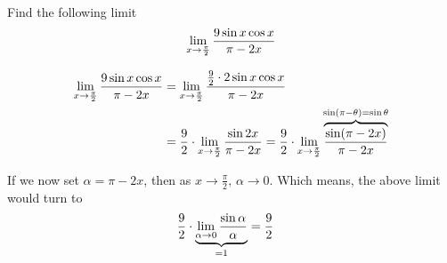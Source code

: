 


\question[3] Find the following limit \[\lim_{x\to\frac{\pi}{2}}\dfrac{9 \sin x\cos x}{\pi - 2x}\]

\watchout[-40pt]

\ifprintanswers
\fi 

\begin{solution}[\halfpage]
  \begin{align}
    \lim_{x\to\frac{\pi}{2}}\dfrac{9 \sin x\cos x}{\pi - 2x} &=
    \lim_{x\to\frac{\pi}{2}}\dfrac{\frac{9}{2}\cdot 2\sin x\cos x}{\pi - 2x} \\
    &= \dfrac{9}{2}\cdot\lim_{x\to\frac{\pi}{2}}\dfrac{\sin 2x}{\pi-2x} =
    \dfrac{9}{2}\cdot\lim_{x\to\frac{\pi}{2}}\overbrace{\dfrac{\sin (\pi-2x)}{\pi-2x}}^{\sin(\pi-\theta) = \sin\theta}
  \end{align}
  
  If we now set $\alpha = \pi - 2x$, then as $x\to\frac\pi{2},\, \alpha\to 0$. Which means, 
  the above limit would turn to 
  \begin{align}
    &\dfrac{9}{2}\cdot\underbrace{\lim_{\alpha\to 0}\dfrac{\sin\alpha}{\alpha}}
    _{= 1} = \dfrac{9}{2}
  \end{align}
\end{solution}
